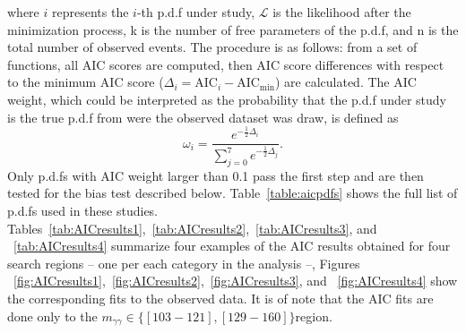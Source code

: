 where $i$ represents the $i$-th p.d.f under study, $\mathcal{L}$ is the likelihood after the minimization process,
k is the number of free parameters of the p.d.f, and n is the total
number of observed events. The procedure is as follows: from a set of
functions, all AIC scores are computed, then AIC score differences
with respect to the minimum AIC score
($\Delta_{i} = \mathrm{AIC}_{i} -\mathrm{AIC_{min}}$) are calculated.
The AIC weight, which could be interpreted as the probability that the
p.d.f under study is the true p.d.f from were the observed
dataset was draw, is defined as
\begin{equation}
\label{eq:AICweight}
\omega_{i} = \frac{e^{-\frac{1}{2}\Delta_{i}}}{\sum\limits_{j=0}^{7}e^{-\frac{1}{2}\Delta_{j}}}.
\end{equation}
Only p.d.fs with AIC weight larger than 0.1 pass the first step and
are then tested for the bias test described
below. Table~\ref{table:aicpdfs} shows the full list of p.d.fs used in
these studies. Tables~\ref{tab:AICresults1},~\ref{tab:AICresults2},~\ref{tab:AICresults3},  and
~\ref{tab:AICresults4} summarize four examples of the AIC results
obtained for four search regions -- one per each
category in the analysis --, Figures ~\ref{fig:AICresults1},~\ref{fig:AICresults2},~\ref{fig:AICresults3}, and
~\ref{fig:AICresults4} show the corresponding fits to the observed
data. It is of note that the AIC fits are done only to the
$m_{\gamma\gamma}\in \{[103-121],[129-160]\}$\GeV region.
